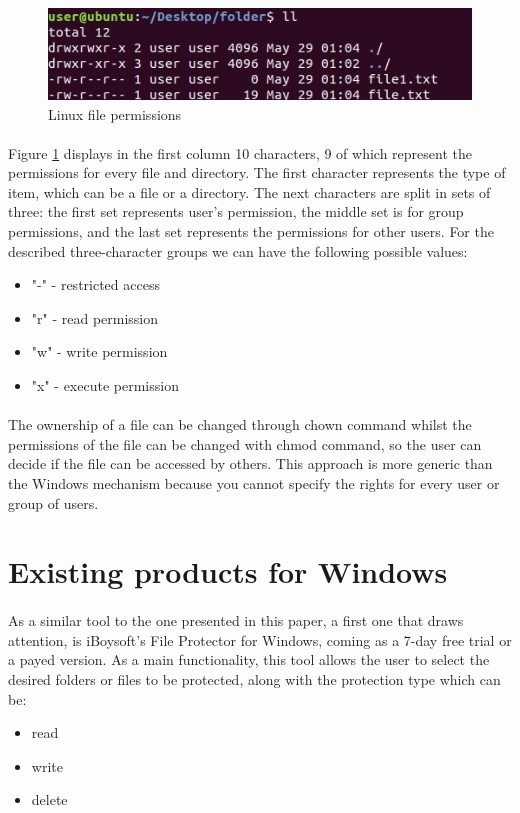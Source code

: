 	\begin{figure}[h!]
		\includegraphics[width=\linewidth]{images/linuxFilePermissions.jpg}
		\caption{Linux file permissions}
		\label{fig:linuxFilePermissions}
	\end{figure}
	
	\paragraph{}
	Figure \ref{fig:linuxFilePermissions} displays in the first column 10 characters, 9 of which represent the permissions for every file and directory. The first character represents the type of item, which can be a file or a directory. The next characters are split in sets of three: the first set represents user's permission, the middle set is for group permissions, and the last set represents the permissions for other users. For the described three-character groups we can have the following possible values:
	\begin{itemize}
		\item "-" - restricted access
		\item "r" - read permission
		\item "w" - write permission
		\item "x" - execute permission
	\end{itemize}
	
	\paragraph{}
	The ownership of a file can be changed through chown command whilst the permissions of the file can be changed with chmod command, so the user can decide if the file can be accessed by others. This approach is more generic than the Windows mechanism because you cannot specify the rights for every user or group of users.
	
		
	\section{Existing products for Windows}
	\paragraph{}
	As a similar tool to the one presented in this paper, a first one that draws attention, is iBoysoft's File Protector for Windows, coming as a 7-day free trial or a payed version. As a main functionality, this tool allows the user to select the desired folders or files to be protected, along with the protection type which can be:
	\begin{itemize}
		\item read
		\item write
		\item delete
	\end{itemize}
	
